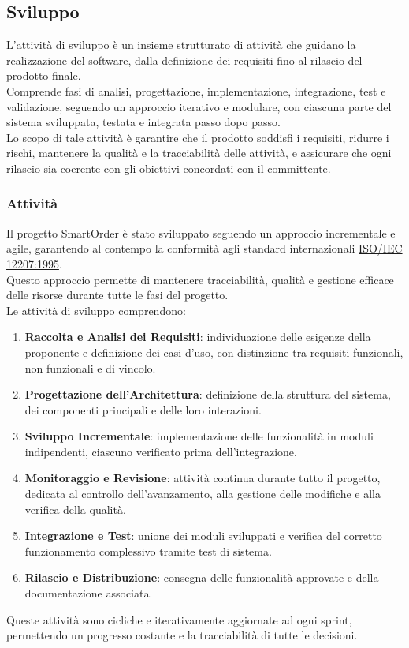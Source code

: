 	\subsection{Sviluppo}
	L'attività di sviluppo è un insieme strutturato di attività che guidano la realizzazione del software, dalla definizione dei requisiti fino al rilascio del prodotto finale.\\ 
	Comprende fasi di analisi, progettazione, implementazione, integrazione, test e validazione, seguendo un approccio iterativo e modulare, con ciascuna parte del sistema sviluppata, testata e integrata passo dopo passo.\\
	Lo scopo di tale attività è garantire che il prodotto soddisfi i requisiti, ridurre i rischi, mantenere la qualità e la tracciabilità delle attività, e assicurare che ogni rilascio sia coerente con gli obiettivi concordati con il committente.
	
	\subsubsection{Attività}
	Il progetto SmartOrder è stato sviluppato seguendo un approccio incrementale e agile, garantendo al contempo la conformità agli standard internazionali 
	\href{https://www.math.unipd.it/~tullio/IS-1/2009/Approfondimenti/ISO_12207-1995.pdf}{ISO/IEC 12207:1995}.\\ 
	Questo approccio permette di mantenere tracciabilità, qualità e gestione efficace delle risorse durante tutte le fasi del progetto.\\
	Le attività di sviluppo comprendono:
	\begin{enumerate}[itemsep=3pt, parsep=1pt, label=$\scriptstyle\bullet$]
		\item \textbf{Raccolta e Analisi dei Requisiti}: individuazione delle esigenze della proponente e definizione dei casi d’uso, con distinzione tra requisiti funzionali, non funzionali e di vincolo.
		\item \textbf{Progettazione dell’Architettura}: definizione della struttura del sistema, dei componenti principali e delle loro interazioni.
		\item \textbf{Sviluppo Incrementale}: implementazione delle funzionalità in moduli indipendenti, ciascuno verificato prima dell’integrazione.
		\item \textbf{Monitoraggio e Revisione}: attività continua durante tutto il progetto, dedicata al controllo dell’avanzamento, alla gestione delle modifiche e alla verifica della qualità.
		\item \textbf{Integrazione e Test}: unione dei moduli sviluppati e verifica del corretto funzionamento complessivo tramite test di sistema.
		\item \textbf{Rilascio e Distribuzione}: consegna delle funzionalità approvate e della documentazione associata.
	\end{enumerate}
	Queste attività sono cicliche e iterativamente aggiornate ad ogni sprint, permettendo un progresso costante e la tracciabilità di tutte le decisioni.

